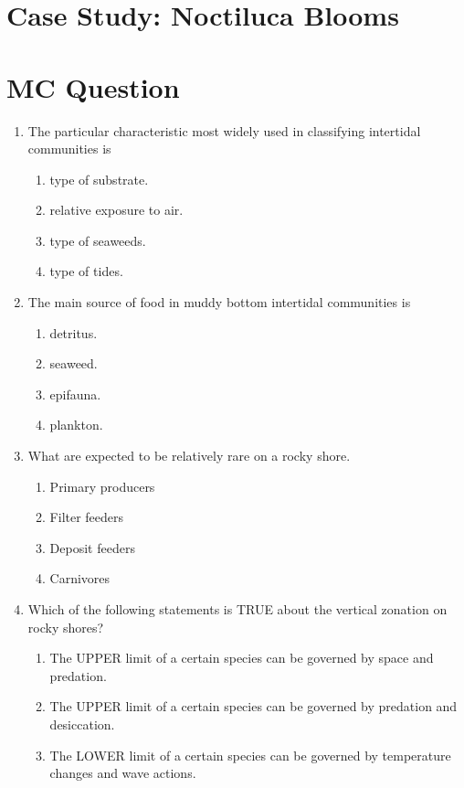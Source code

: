\documentclass{report}
\begin{document}
\section{Case Study: Noctiluca Blooms}


\section{MC Question}
\begin{enumerate}
    \item The particular characteristic most widely used in classifying intertidal communities is
    \begin{enumerate}
        \item   type of substrate. 
        \item   relative exposure to air. 
        \item   type of seaweeds. 
        \item   type of tides. 
    \end{enumerate}
    \item The main source of food in muddy bottom intertidal communities is
    \begin{enumerate}
        \item   detritus. 
        \item   seaweed. 
        \item   epifauna. 
        \item   plankton. 
    \end{enumerate}
    \item What are expected to be relatively rare on a rocky shore.
    \begin{enumerate}
        \item   Primary producers 
        \item   Filter feeders 
        \item   Deposit feeders 
        \item   Carnivores 
    \end{enumerate}
    \item Which of the following statements is TRUE about the vertical zonation on rocky shores?
    \begin{enumerate}
        \item   The UPPER limit of a certain species can be governed by space and predation.
        \item   The UPPER limit of a certain species can be governed by predation and desiccation.
        \item   The LOWER limit of a certain species can be governed by temperature changes and wave actions.

\end{enumerate}
\end{enumerate}
\end{document}
